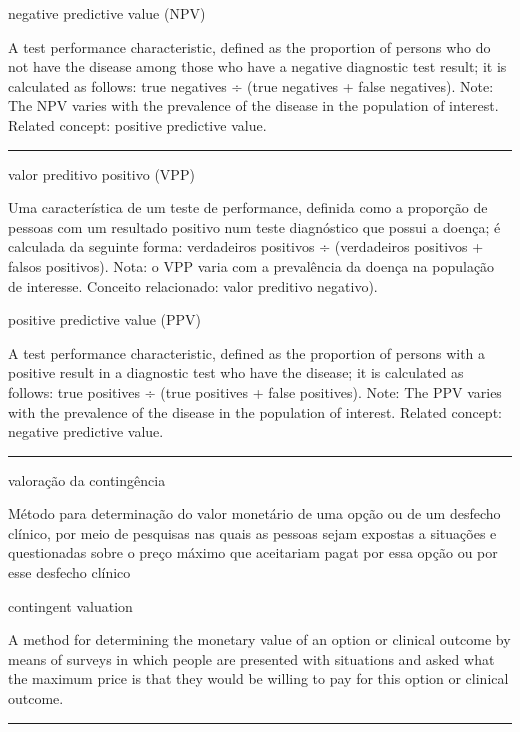 \documentclass[
  openany]{book}
\begin{document}
negative predictive value (NPV)

A test performance characteristic, defined as the proportion of persons who do not have the disease among those who have a negative diagnostic test result; it is calculated as follows: true negatives ÷ (true negatives + false negatives). Note: The NPV varies with the prevalence of the disease in the population of interest. Related concept: positive predictive value.

\begin{center}\rule{0.5\linewidth}{0.5pt}\end{center}

valor preditivo positivo (VPP)

Uma característica de um teste de performance, definida como a proporção de pessoas com um resultado positivo num teste diagnóstico que possui a doença; é calculada da seguinte forma: verdadeiros positivos ÷ (verdadeiros positivos + falsos positivos). Nota: o VPP varia com a prevalência da doença na população de interesse. Conceito relacionado: valor preditivo negativo).

positive predictive value (PPV)

A test performance characteristic, defined as the proportion of persons with a positive result in a diagnostic test who have the disease; it is calculated as follows: true positives ÷ (true positives + false positives). Note: The PPV varies with the prevalence of the disease in the population of interest. Related concept: negative predictive value.

\begin{center}\rule{0.5\linewidth}{0.5pt}\end{center}

valoração da contingência

Método para determinação do valor monetário de uma opção ou de um desfecho clínico, por meio de pesquisas nas quais as pessoas sejam expostas a situações e questionadas sobre o preço máximo que aceitariam pagat por essa opção ou por esse desfecho clínico

contingent valuation

A method for determining the monetary value of an option or clinical outcome by means of surveys in which people are presented with situations and asked what the maximum price is that they would be willing to pay for this option or clinical outcome.

\begin{center}\rule{0.5\linewidth}{0.5pt}\end{center}
\end{document}
